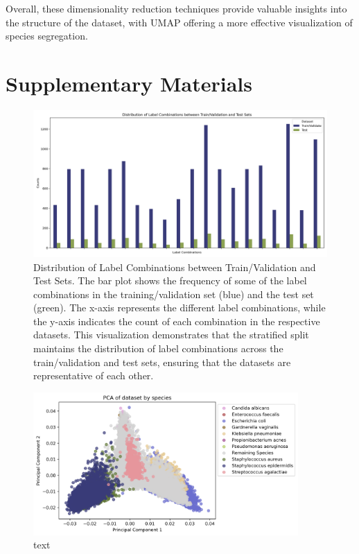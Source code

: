 \documentclass[english,11pt,a4paper,titlepage]{article}
\begin{document}
Overall, these dimensionality reduction techniques provide valuable insights into the structure of the dataset, with UMAP offering a more effective visualization of species segregation.



\newpage
\printbibliography

\clearpage
\renewcommand{\thefigure}{Supplementary \arabic{figure}}
\renewcommand{\figurename}{}
\setcounter{figure}{0}

\section*{Supplementary Materials}

\begin{figure}
	\centering
	\begin{minipage}[b!]{0.8\textwidth}
		\includegraphics[width=\textwidth]{img/2018_train_val_test_split.png}
		\captionsetup{font=small}
		\caption{Distribution of Label Combinations between Train/Validation and Test Sets. The bar plot shows the frequency of some of the label combinations in the training/validation set (blue) and the test set (green). The x-axis represents the different label combinations, while the y-axis indicates the count of each combination in the respective datasets. This visualization demonstrates that the stratified split maintains the distribution of label combinations across the train/validation and test sets, ensuring that the datasets are representative of each other.}
		\label{fig:multilabel_split}
	\end{minipage}
\end{figure}
\clearpage

\begin{figure}[h]
	\centering
	\includegraphics[width=0.9\textwidth]{img/PCA_species.png}
	\caption{text}
	\label{fig:pca_remaining}
\end{figure}
\end{document}
